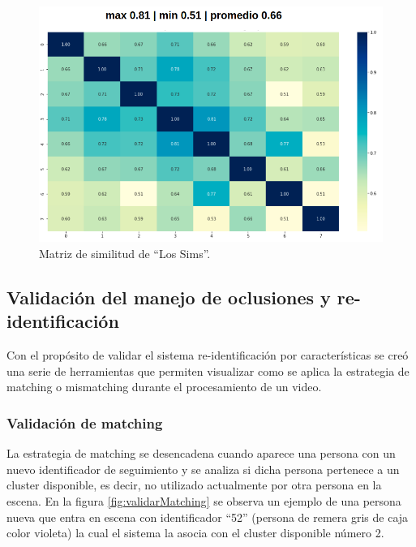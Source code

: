 \begin{figure}[ht]
	\centering
	\includegraphics[scale=.7]{./Figures/matrizSimilitud.png}
	\caption{Matriz de similitud de ``Los Sims''.}
	\label{fig:matrizSimilitud}
\end{figure}

\newpage

\subsection{Validación del manejo de oclusiones y re-identificación}

Con el propósito de validar el sistema re-identificación por características se creó una serie de herramientas que permiten visualizar como se aplica la estrategia de matching o mismatching durante el procesamiento de un video.

\subsubsection{Validación de matching}

La estrategia de matching se desencadena cuando aparece una persona con un nuevo identificador de seguimiento y se analiza si dicha persona pertenece a un cluster disponible, es decir, no utilizado actualmente por otra persona en la escena. En la figura \ref{fig:validarMatching} se observa un ejemplo de una persona nueva que entra en escena con identificador ``52'' (persona de remera gris de caja color violeta) la cual el sistema la asocia con el cluster disponible número 2.

